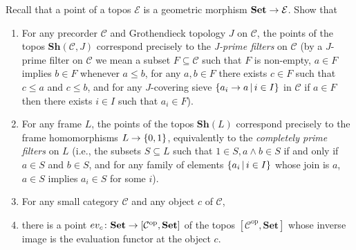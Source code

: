 \documentclass[a4paper]{article}
\begin{document}
\begin{snippetexercise}{}
    Recall that a point of a topos \(\mathcal E\)
    is a geometric morphism \(\mathbf{Set} \to \mathcal E\).
    Show that
    \begin{enumerate}[label=\Alph*]
        \item For any precorder \(\mathcal C\) and Grothendieck topology \(J\)
        on \(\mathcal C\), the points of the topos \(\mathbf{Sh}(\mathcal C, J)\) correspond
        precisely to the \emph{J-prime filters} on \(\mathcal C\) (by a \(J\)-prime filter
        on \(\mathcal C\) we mean a subset \(F\subseteq \mathcal C\) such that \(F\) is non-empty,
        \(a \in F\) implies \(b\in F\) whenever \(a\leq b\), for any \(a,b \in F\) there exists
        \(c\in F\) such that \(c \leq a\) and \(c\leq b\), and for any \(J\)-covering sieve
        \(\{a_i \to a \,|\, i \in I\}\) in \(\mathcal C\) if
        \(a \in F\) then there exists \(i\in I\) such that \(a_i \in F\)).
        \item For any frame \(L\), the points of the topos
        \(\mathbf{Sh}(L)\) correspond precisely to the frame homomorphisms
        \(L \to \{0,1\}\), equivalently to the \emph{completely prime filters}
        on \(L\) (i.e., the subsets \(S \subseteq L\) such that \(1 \in S, a \land b \in S\) if
        and only if \(a \in S\) and \(b \in S\), and for any family of elements
        \(\{a_i \,|\, i\in I\}\) whose join is \(a\), \(a \in S\) implies \(a_i \in S\) for
        some \(i\)).
        \item For any small category \(\mathcal C\) and any object \(c\) of \(\mathcal C\),
        \item there is a point \(ev_c \colon \mathbf{Set} \to [\mathcal C^{\text{op}}, \mathbf{Set}]\)
        of the topos \([\mathcal C^{\text{op}}, \mathbf{Set}]\) whose inverse image is the evaluation
        functor at the object \(c\).
    \end{enumerate}
\end{snippetexercise}
\end{document}
